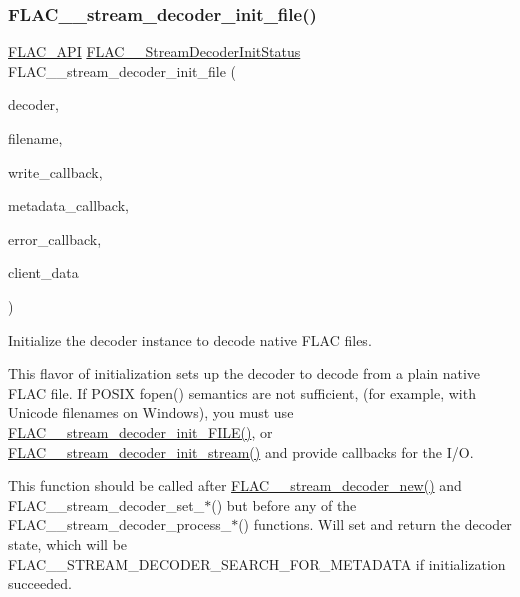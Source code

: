 \subsubsection{\texorpdfstring{F\+L\+A\+C\+\_\+\+\_\+stream\+\_\+decoder\+\_\+init\+\_\+file()}{FLAC\_\_stream\_decoder\_init\_file()}}
{\footnotesize\ttfamily \hyperlink{group__flac__export_ga56ca07df8a23310707732b1c0007d6f5}{F\+L\+A\+C\+\_\+\+A\+PI} \hyperlink{group__flac__stream__decoder_gaaed54a24ac6310d29c5cafba79759c44}{F\+L\+A\+C\+\_\+\+\_\+\+Stream\+Decoder\+Init\+Status} F\+L\+A\+C\+\_\+\+\_\+stream\+\_\+decoder\+\_\+init\+\_\+file (\begin{DoxyParamCaption}\item[{\hyperlink{struct_f_l_a_c_____stream_decoder}{F\+L\+A\+C\+\_\+\+\_\+\+Stream\+Decoder} $\ast$}]{decoder,  }\item[{\hyperlink{zconf_8h_a2c212835823e3c54a8ab6d95c652660e}{const} char $\ast$}]{filename,  }\item[{\hyperlink{group__flac__stream__decoder_ga61e48dc2c0d2f6c5519290ff046874a4}{F\+L\+A\+C\+\_\+\+\_\+\+Stream\+Decoder\+Write\+Callback}}]{write\+\_\+callback,  }\item[{\hyperlink{group__flac__stream__decoder_ga6aa87c01744c1c601b7f371f627b6e14}{F\+L\+A\+C\+\_\+\+\_\+\+Stream\+Decoder\+Metadata\+Callback}}]{metadata\+\_\+callback,  }\item[{\hyperlink{group__flac__stream__decoder_gac896ee6a12668e9015fab4fbc6aae996}{F\+L\+A\+C\+\_\+\+\_\+\+Stream\+Decoder\+Error\+Callback}}]{error\+\_\+callback,  }\item[{\hyperlink{png_8h_ac9c84fa68bbad002983e35ce3663c686}{void} $\ast$}]{client\+\_\+data }\end{DoxyParamCaption})}

Initialize the decoder instance to decode native F\+L\+AC files.

This flavor of initialization sets up the decoder to decode from a plain native F\+L\+AC file. If P\+O\+S\+IX fopen() semantics are not sufficient, (for example, with Unicode filenames on Windows), you must use \hyperlink{group__flac__stream__decoder_ga38f9eb46bf112af205f86b4cbac9980c}{F\+L\+A\+C\+\_\+\+\_\+stream\+\_\+decoder\+\_\+init\+\_\+\+F\+I\+L\+E()}, or \hyperlink{group__flac__stream__decoder_ga32c28a56a2bdfa2333edbd3d991894d7}{F\+L\+A\+C\+\_\+\+\_\+stream\+\_\+decoder\+\_\+init\+\_\+stream()} and provide callbacks for the I/O.

This function should be called after \hyperlink{group__flac__stream__decoder_ga7159eefc074dfbab4a37462f69326091}{F\+L\+A\+C\+\_\+\+\_\+stream\+\_\+decoder\+\_\+new()} and F\+L\+A\+C\+\_\+\+\_\+stream\+\_\+decoder\+\_\+set\+\_\+$\ast$() but before any of the F\+L\+A\+C\+\_\+\+\_\+stream\+\_\+decoder\+\_\+process\+\_\+$\ast$() functions. Will set and return the decoder state, which will be F\+L\+A\+C\+\_\+\+\_\+\+S\+T\+R\+E\+A\+M\+\_\+\+D\+E\+C\+O\+D\+E\+R\+\_\+\+S\+E\+A\+R\+C\+H\+\_\+\+F\+O\+R\+\_\+\+M\+E\+T\+A\+D\+A\+TA if initialization succeeded.


